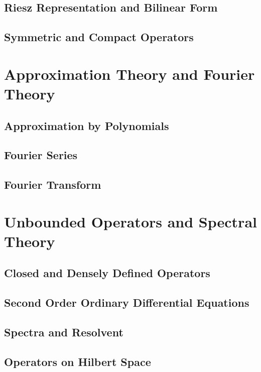 \documentclass[a4paper, 12pt]{article}
\begin{document}
\subsection{Riesz Representation and Bilinear Form}

\newpage

\subsection{Symmetric and Compact Operators}

\newpage

\section{Approximation Theory and Fourier Theory}

\subsection{Approximation by Polynomials}

\newpage

\subsection{Fourier Series}

\newpage

\subsection{Fourier Transform}

\newpage

\section{Unbounded Operators and Spectral Theory}
\subsection{Closed and Densely Defined Operators}

\newpage

\subsection{Second Order Ordinary Differential Equations}

\newpage

\subsection{Spectra and Resolvent}

\newpage

\subsection{Operators on Hilbert Space}

\end{document}
